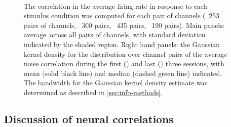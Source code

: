\begin{figure}[htbp]%
    \centering
    \hspace*{\fill}
    \hspace*{\fill}\hspace{.2cm}\hspace*{\fill}
    \hspace*{\fill}
    \\
    \hspace*{\fill}
    \hspace*{\fill}\hspace{.2cm}\hspace*{\fill}
    \hspace*{\fill}
    \caption{
The correlation in the average firing rate in response to each stimulus condition was computed for each pair of channels (\protect{}~\num{253} pairs of channels, \protect{}~\num{300} pairs, \protect{}~\num{435} pairs, \protect{}~\num{190} pairs).
Main panels: average across all pairs of channels, with standard deviation indicated by the shaded region.
Right hand panels: the Gaussian kernel density for the distribution over channel pairs of the average noise correlation during the first () and last () three sessions, with mean (solid black line) and median (dashed green line) indicated.
The bandwidth for the Gaussian kernel density estimate was determined as described in \autoref{sec:info-methods}.
}
    \label{fig:pl_noisecor}
\end{figure}


\subsection{Discussion of neural correlations}

